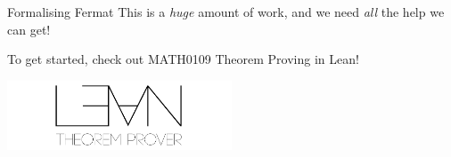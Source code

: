 \documentclass[10pt]{beamer}
\theoremstyle{definition}
\begin{document}
\begin{frame}[t]{Formalising Fermat}
\vspace{0.5cm} This is a \emph{huge} amount of work, and we need \emph{all} the help we can get!

\vspace{0.5cm} To get started, check out MATH0109 Theorem Proving in Lean!

\begin{center}
\includegraphics[width=0.5\textwidth]{lean.png}
\end{center}

\end{frame}
\end{document}

